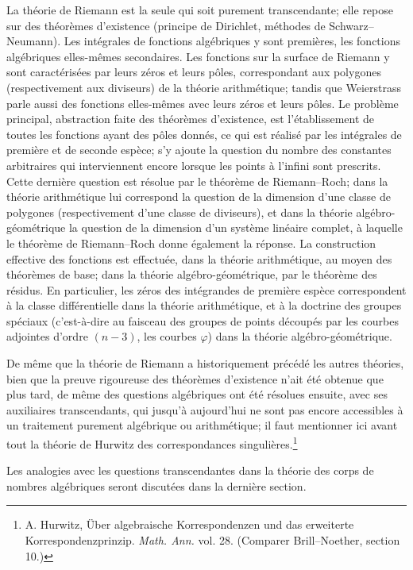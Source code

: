 La théorie de Riemann est la seule qui soit purement transcendante; elle repose sur des théorèmes d'existence (principe de Dirichlet, méthodes de Schwarz--Neumann). Les intégrales de fonctions algébriques y sont premières, les fonctions algébriques elles-mêmes secondaires. Les fonctions sur la surface de Riemann y sont caractérisées par leurs zéros et leurs pôles, correspondant aux polygones (respectivement aux diviseurs) de la théorie arithmétique; tandis que Weierstrass parle aussi des fonctions elles-mêmes avec leurs zéros et leurs pôles. Le problème principal, abstraction faite des théorèmes d'existence, est l'établissement de toutes les fonctions ayant des pôles donnés, ce qui est réalisé par les intégrales de première et de seconde espèce; s'y ajoute la question du nombre des constantes arbitraires qui interviennent encore lorsque les points à l'infini sont prescrits. Cette dernière question est résolue par le théorème de Riemann--Roch; dans la théorie arithmétique lui correspond la question de la dimension d'une classe de polygones (respectivement d'une classe de diviseurs), et dans la théorie algébro-géométrique la question de la dimension d'un système linéaire complet, à laquelle le théorème de Riemann--Roch donne également la réponse. La construction effective des fonctions est effectuée, dans la théorie arithmétique, au moyen des théorèmes de base; dans la théorie algébro-géométrique, par le théorème des résidus. En particulier, les zéros des intégrandes de première espèce correspondent à la classe différentielle dans la théorie arithmétique, et à la doctrine des groupes spéciaux (c'est-à-dire au faisceau des groupes de points découpés par les courbes adjointes d'ordre \((n-3)\), les courbes \(\varphi\)) dans la théorie algébro-géométrique.

De même que la théorie de Riemann a historiquement précédé les autres théories, bien que la preuve rigoureuse des théorèmes d'existence n'ait été obtenue que plus tard, de même des questions algébriques ont été résolues ensuite, avec ses auxiliaires transcendants, qui jusqu'à aujourd'hui ne sont pas encore accessibles à un traitement purement algébrique ou arithmétique; il faut mentionner ici avant tout la théorie de Hurwitz des correspondances singulières.\footnote{A. Hurwitz, Über algebraische Korrespondenzen und das erweiterte Korrespondenzprinzip. \emph{Math. Ann.} vol. 28. (Comparer Brill--Noether, section 10.)}

Les analogies avec les questions transcendantes dans la théorie des corps de nombres algébriques seront discutées dans la dernière section.

